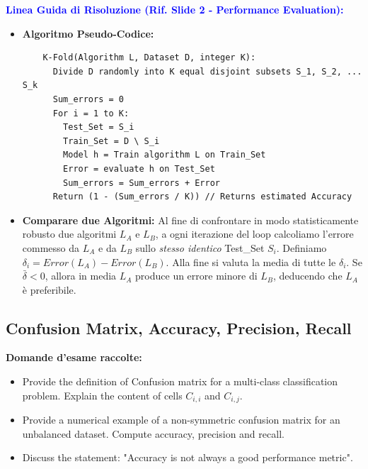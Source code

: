 \documentclass[11pt,a4paper]{article}
\begin{document}
\textbf{\textcolor{blue}{Linea Guida di Risoluzione (Rif. Slide 2 - Performance Evaluation):}}
\begin{itemize}
    \item \textbf{Algoritmo Pseudo-Codice:}
    \begin{verbatim}
    K-Fold(Algorithm L, Dataset D, integer K):
      Divide D randomly into K equal disjoint subsets S_1, S_2, ... S_k
      Sum_errors = 0
      For i = 1 to K:
        Test_Set = S_i
        Train_Set = D \ S_i
        Model h = Train algorithm L on Train_Set
        Error = evaluate h on Test_Set
        Sum_errors = Sum_errors + Error
      Return (1 - (Sum_errors / K)) // Returns estimated Accuracy
    \end{verbatim}
    \item \textbf{Comparare due Algoritmi:} Al fine di confrontare in modo statisticamente robusto due algoritmi $L_A$ e $L_B$, a ogni iterazione del loop calcoliamo l'errore commesso da $L_A$ e da $L_B$ sullo \textit{stesso identico} Test\_Set $S_i$. Definiamo $\delta_i = Error(L_A) - Error(L_B)$. Alla fine si valuta la media di tutte le $\delta_i$. Se $\bar{\delta} < 0$, allora in media $L_A$ produce un errore minore di $L_B$, deducendo che $L_A$ è preferibile.
\end{itemize}

\subsection{Confusion Matrix, Accuracy, Precision, Recall}
\textbf{Domande d'esame raccolte:}
\begin{itemize}
    \item Provide the definition of Confusion matrix for a multi-class classification problem. Explain the content of cells $C_{i,i}$ and $C_{i,j}$.
    \item Provide a numerical example of a non-symmetric confusion matrix for an unbalanced dataset. Compute accuracy, precision and recall.
    \item Discuss the statement: "Accuracy is not always a good performance metric".
\end{itemize}
\end{document}
